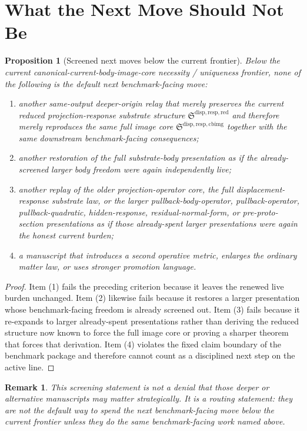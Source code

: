 \documentclass[11pt]{article}
\newcommand{\ReducedStructure}{\mathfrak S^{\mathrm{disp,resp,red}}}
\newcommand{\CurrentBodyImageCore}{\mathfrak S^{\mathrm{disp,resp,cbimg}}}
\newtheorem{proposition}{Proposition}
\newtheorem{remark}{Remark}
\begin{document}
\section{What the Next Move Should Not Be}

\begin{proposition}[Screened next moves below the current frontier]
Below the current canonical-current-body-image-core necessity / uniqueness frontier, none of the following is the default next benchmark-facing move:
\begin{enumerate}
    \item another same-output deeper-origin relay that merely preserves the current reduced projection-response substrate structure \(\ReducedStructure\) and therefore merely reproduces the same full image core \(\CurrentBodyImageCore\) together with the same downstream benchmark-facing consequences;
    \item another restoration of the full substrate-body presentation as if the already-screened larger body freedom were again independently live;
    \item another replay of the older projection-operator core, the full displacement-response substrate law, or the larger pullback-body-operator, pullback-operator, pullback-quadratic, hidden-response, residual-normal-form, or pre-proto-section presentations as if those already-spent larger presentations were again the honest current burden;
    \item a manuscript that introduces a second operative metric, enlarges the ordinary matter law, or uses stronger promotion language.
\end{enumerate}
\end{proposition}

\begin{proof}
Item (1) fails the preceding criterion because it leaves the renewed live burden unchanged. Item (2) likewise fails because it restores a larger presentation whose benchmark-facing freedom is already screened out. Item (3) fails because it re-expands to larger already-spent presentations rather than deriving the reduced structure now known to force the full image core or proving a sharper theorem that forces that derivation. Item (4) violates the fixed claim boundary of the benchmark package and therefore cannot count as a disciplined next step on the active line.
\end{proof}

\begin{remark}
This screening statement is not a denial that those deeper or alternative manuscripts may matter strategically. It is a routing statement: they are not the default way to spend the next benchmark-facing move below the current frontier unless they do the same benchmark-facing work named above.
\end{remark}
\end{document}
